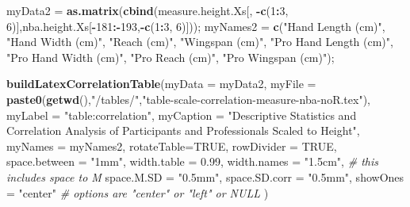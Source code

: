\documentclass[]{article}
\newenvironment{Shaded}{\begin{snugshade}}{\end{snugshade}}
\newcommand{\CommentTok}[1]{\textcolor[rgb]{0.56,0.35,0.01}{\textit{#1}}}
\newcommand{\DataTypeTok}[1]{\textcolor[rgb]{0.13,0.29,0.53}{#1}}
\newcommand{\DecValTok}[1]{\textcolor[rgb]{0.00,0.00,0.81}{#1}}
\newcommand{\FloatTok}[1]{\textcolor[rgb]{0.00,0.00,0.81}{#1}}
\newcommand{\KeywordTok}[1]{\textcolor[rgb]{0.13,0.29,0.53}{\textbf{#1}}}
\newcommand{\NormalTok}[1]{#1}
\newcommand{\OperatorTok}[1]{\textcolor[rgb]{0.81,0.36,0.00}{\textbf{#1}}}
\newcommand{\OtherTok}[1]{\textcolor[rgb]{0.56,0.35,0.01}{#1}}
\newcommand{\StringTok}[1]{\textcolor[rgb]{0.31,0.60,0.02}{#1}}
\begin{document}
\begin{Shaded}
\begin{Highlighting}[]
\NormalTok{myData2 =}\StringTok{ }\KeywordTok{as.matrix}\NormalTok{(}\KeywordTok{cbind}\NormalTok{(measure.height.Xs[, }\OperatorTok{-}\KeywordTok{c}\NormalTok{(}\DecValTok{1}\OperatorTok{:}\DecValTok{3}\NormalTok{, }\DecValTok{6}\NormalTok{)],nba.height.Xs[}\OperatorTok{-}\DecValTok{181}\OperatorTok{:-}\DecValTok{193}\NormalTok{,}\OperatorTok{-}\KeywordTok{c}\NormalTok{(}\DecValTok{1}\OperatorTok{:}\DecValTok{3}\NormalTok{, }\DecValTok{6}\NormalTok{)]));}
\NormalTok{myNames2 =}\StringTok{ }\KeywordTok{c}\NormalTok{(}\StringTok{"Hand Length (cm)"}\NormalTok{, }\StringTok{"Hand Width (cm)"}\NormalTok{,  }
             \StringTok{"Reach (cm)"}\NormalTok{, }\StringTok{"Wingspan (cm)"}\NormalTok{,}
            \StringTok{"Pro Hand Length (cm)"}\NormalTok{, }\StringTok{"Pro Hand Width (cm)"}\NormalTok{, }
            \StringTok{"Pro Reach (cm)"}\NormalTok{, }\StringTok{"Pro Wingspan (cm)"}\NormalTok{);}


\KeywordTok{buildLatexCorrelationTable}\NormalTok{(}\DataTypeTok{myData =}\NormalTok{ myData2, }
                                \DataTypeTok{myFile =} \KeywordTok{paste0}\NormalTok{(}\KeywordTok{getwd}\NormalTok{(),}\StringTok{"/tables/"}\NormalTok{,}\StringTok{"table-scale-correlation-measure-nba-noR.tex"}\NormalTok{),}
                                \DataTypeTok{myLabel =} \StringTok{"table:correlation"}\NormalTok{,}
                                \DataTypeTok{myCaption =} \StringTok{"Descriptive Statistics and Correlation Analysis of Participants and Professionals Scaled to Height"}\NormalTok{,}
                                \DataTypeTok{myNames =}\NormalTok{ myNames2,}
                                \DataTypeTok{rotateTable=}\OtherTok{TRUE}\NormalTok{,}
                                \DataTypeTok{rowDivider =} \OtherTok{TRUE}\NormalTok{,}
                                \DataTypeTok{space.between =} \StringTok{"1mm"}\NormalTok{,}
                                \DataTypeTok{width.table =} \FloatTok{0.99}\NormalTok{,}
                                \DataTypeTok{width.names =} \StringTok{"1.5cm"}\NormalTok{, }\CommentTok{# this includes space to M}
                                \DataTypeTok{space.M.SD =} \StringTok{"0.5mm"}\NormalTok{,}
                                \DataTypeTok{space.SD.corr =} \StringTok{"0.5mm"}\NormalTok{,}
                                \DataTypeTok{showOnes =} \StringTok{"center"} \CommentTok{# options are "center" or "left" or NULL}
\NormalTok{                                )}
\end{Highlighting}
\end{Shaded}
\end{document}

